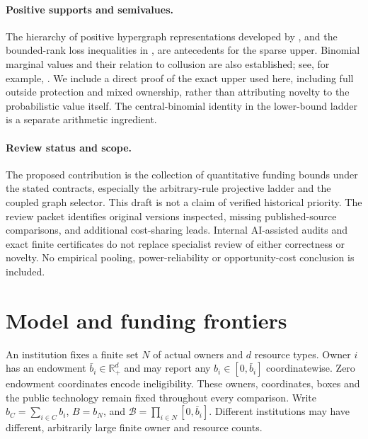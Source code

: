 \documentclass[11pt]{article}
\newcommand{\R}{\mathbb R}
\theoremstyle{definition}\newtheorem{definition}[theorem]{Definition}
\theoremstyle{remark}\newtheorem{remark}[theorem]{Remark}
\begin{document}
\paragraph{Positive supports and semivalues.}
The hierarchy of positive hypergraph representations developed by
\citet{FeigeEtAl2014}, and the bounded-rank loss inequalities in
\citet{EzraEtAl2018}, are antecedents for the sparse upper.
Binomial marginal values and their relation to collusion are also established;
see, for example, \citet{Casajus2011}. We include a direct proof of the exact
upper used here, including full outside protection and mixed ownership, rather
than attributing novelty to the probabilistic value itself. The central-binomial
identity in the lower-bound ladder is a separate arithmetic ingredient.

\paragraph{Review status and scope.}
The proposed contribution is the collection of quantitative funding bounds
under the stated contracts, especially the arbitrary-rule projective ladder and the coupled graph selector.
This draft is not a claim of verified historical priority. The review packet
identifies original versions inspected, missing published-source comparisons,
and additional cost-sharing leads. Internal AI-assisted audits and exact
finite certificates do not replace specialist review of either correctness or
novelty. No empirical pooling, power-reliability or opportunity-cost conclusion
is included.

\section{Model and funding frontiers}\label{sec:model}
An institution fixes a finite set $N$ of actual owners and $d$ resource types.
Owner $i$ has an endowment $\bar b_i\in\R_+^d$ and may report any
$b_i\in[0,\bar b_i]$ coordinatewise. Zero endowment coordinates encode
ineligibility. These owners, coordinates, boxes and the public technology
remain fixed throughout every comparison. Write $b_C=\sum_{i\in C}b_i$,
$B=b_N$, and $\mathcal B=\prod_{i\in N}[0,\bar b_i]$.
Different institutions may have different, arbitrarily large finite owner and
resource counts.
\end{document}
